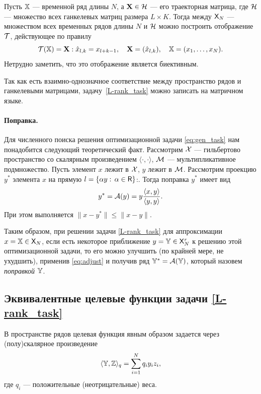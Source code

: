 \documentclass[12pt,a4paper,fleqn,leqno]{article}
\begin{document}
Пусть $\mathbb{X}$ --- временной ряд длины $N$, а $\mathbf{X} \in \mathcal{H}$ --- его траекторная матрица, где $\mathcal{H}$ --- множество всех ганкелевых матриц размера $L \times K$. Тогда между $\mathsf{X}_N$ --- множеством всех временных рядов длины $N$ и $\mathcal{H}$ можно построить отображение $\mathcal{T}$, действующее по правилу
\begin{equation*}
\mathcal{T}(\mathbb{X}) = \mathbf{X}: \hat x_{l, k} = x_{l + k - 1}, \quad \mathbf{X} = (\hat x_{l,k}), \quad \mathbb{X} = (x_1, \ldots, x_N).
\end{equation*}
Нетрудно заметить, что это отображение является биективным.

Так как есть взаимно-однозначное соответствие между пространство рядов и ганкелевыми матрицами,
задачу~\eqref{L-rank_task} можно записать на матричном языке.

\paragraph{Поправка.} Для численного поиска решения оптимизационной задачи \eqref{eq:gen_task} нам понадобится следующий теоретический факт.
Рассмотрим $\mathcal{X}$ --- гильбертово пространство со скалярным произведением $\langle\cdot, \cdot\rangle$, $\mathcal{M}$ --- мультипликативное подмножество. Пусть элемент $x$ лежит в $\mathcal{X}$, $y$ лежит в $\mathcal{M}$. Рассмотрим проекцию $y^*$ элемента $x$ на прямую $l = \{\alpha y:\, \alpha \in \mathsf{R}\}$:. Тогда поправка $y^*$ имеет вид
\begin{equation}
\label{eq:adjust}
y^* = \mathcal{A}(y)= y \frac{\langle x, y\rangle}{\langle y, y\rangle}.
\end{equation}
При этом выполняется $\|x - y^*\| \le \|x - y\|$.

Таким образом, при решении задачи \eqref{L-rank_task} для аппроксимации $x=\mathbb{X} \in \mathsf{X}_N$, если есть некоторое приближение $y=\mathbb{Y} \in \mathsf{X}_N^r$ к решению этой оптимизационной задачи, то его можно улучшить (по крайней мере, не ухудшить), применив \eqref{eq:adjust} и получив ряд $\mathbb{Y}^*=\mathcal{A}(\mathbb{Y})$, который назовем \emph{поправкой $\mathbb{Y}$}.

\subsection{Эквивалентные целевые функции задачи \eqref{L-rank_task}}
В пространстве рядов целевая функция явным образом задается через (полу)скалярное произведение
\begin{equation}
\label{eq:norm_ser}
    \langle\mathbb{Y},\mathbb{Z}\rangle_q = \sum_{i = 1}^N q_i y_i z_i,
\end{equation}
где $q_i$ --- положительные (неотрицательные) веса.
\end{document}
